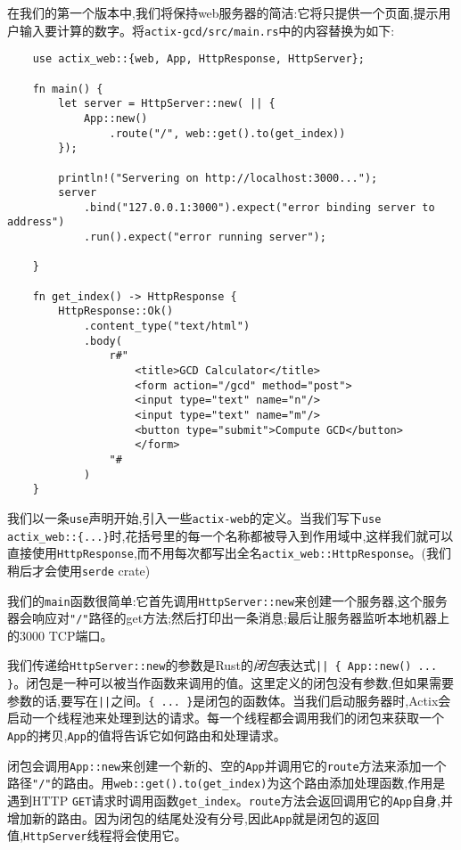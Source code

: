 在我们的第一个版本中,我们将保持web服务器的简洁:它将只提供一个页面,提示用户输入要计算的数字。将\texttt{actix-gcd/src/main.rs}中的内容替换为如下:
\begin{verbatim}
    use actix_web::{web, App, HttpResponse, HttpServer};

    fn main() {
        let server = HttpServer::new( || {
            App::new()
                .route("/", web::get().to(get_index))
        });

        println!("Servering on http://localhost:3000...");
        server
            .bind("127.0.0.1:3000").expect("error binding server to     address")
            .run().expect("error running server");

    }

    fn get_index() -> HttpResponse {
        HttpResponse::Ok()
            .content_type("text/html")
            .body(
                r#"
                    <title>GCD Calculator</title>
                    <form action="/gcd" method="post">
                    <input type="text" name="n"/>
                    <input type="text" name="m"/>
                    <button type="submit">Compute GCD</button>
                    </form>
                "#
            )
    }
\end{verbatim}

我们以一条\texttt{use}声明开始,引入一些\texttt{actix-web}的定义。当我们写下\texttt{use actix\_web::\{...\}}时,花括号里的每一个名称都被导入到作用域中,这样我们就可以直接使用\texttt{HttpResponse},而不用每次都写出全名\texttt{actix\_web::HttpResponse}。(我们稍后才会使用\texttt{serde} crate)

我们的\texttt{main}函数很简单:它首先调用\texttt{HttpServer::new}来创建一个服务器,这个服务器会响应对\texttt{"/"}路径的get方法;然后打印出一条消息;最后让服务器监听本地机器上的3000 TCP端口。

我们传递给\texttt{HttpServer::new}的参数是Rust的\emph{闭包}表达式\texttt{|| \{ App::new() ... \}}。闭包是一种可以被当作函数来调用的值。这里定义的闭包没有参数,但如果需要参数的话,要写在\texttt{||}之间。\texttt{\{ ... \}}是闭包的函数体。当我们启动服务器时,Actix会启动一个线程池来处理到达的请求。每一个线程都会调用我们的闭包来获取一个\texttt{App}的拷贝,\texttt{App}的值将告诉它如何路由和处理请求。

闭包会调用\texttt{App::new}来创建一个新的、空的\texttt{App}并调用它的\texttt{route}方法来添加一个路径\texttt{"/"}的路由。用\texttt{web::get().to(get\_index)}为这个路由添加处理函数,作用是遇到HTTP \texttt{GET}请求时调用函数\texttt{get\_index}。\texttt{route}方法会返回调用它的\texttt{App}自身,并增加新的路由。因为闭包的结尾处没有分号,因此\texttt{App}就是闭包的返回值,\texttt{HttpServer}线程将会使用它。

